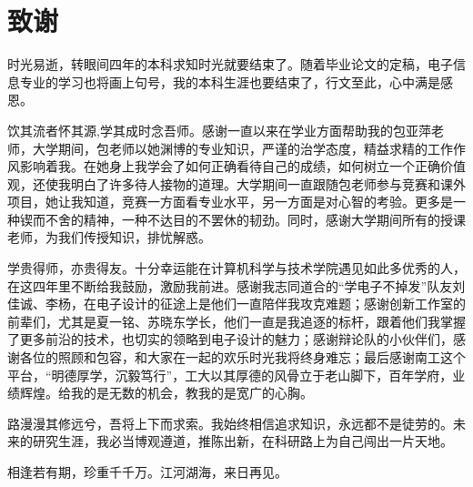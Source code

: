 \chapter[致谢]{致\quad 谢}%
\thispagestyle{noheaderstyle}%

时光易逝，转眼间四年的本科求知时光就要结束了。随着毕业论文的定稿，电子信息专业的学习也将画上句号，我的本科生涯也要结束了，行文至此，心中满是感恩。

饮其流者怀其源,学其成时念吾师。感谢一直以来在学业方面帮助我的包亚萍老师，大学期间，包老师以她渊博的专业知识，严谨的治学态度，精益求精的工作作风影响着我。在她身上我学会了如何正确看待自己的成绩，如何树立一个正确价值观，还使我明白了许多待人接物的道理。大学期间一直跟随包老师参与竞赛和课外项目，她让我知道，竞赛一方面看专业水平，另一方面是对心智的考验。更多是一种锲而不舍的精神，一种不达目的不罢休的韧劲。同时，感谢大学期间所有的授课老师，为我们传授知识，排忧解惑。

学贵得师，亦贵得友。十分幸运能在计算机科学与技术学院遇见如此多优秀的人，在这四年里不断给我鼓励，激励我前进。感谢我志同道合的“学电子不掉发”队友刘佳诚、李杨，在电子设计的征途上是他们一直陪伴我攻克难题；感谢创新工作室的前辈们，尤其是夏一铭、苏晓东学长，他们一直是我追逐的标杆，跟着他们我掌握了更多前沿的技术，也切实的领略到电子设计的魅力；感谢辩论队的小伙伴们，感谢各位的照顾和包容，和大家在一起的欢乐时光我将终身难忘；最后感谢南工这个平台，“明德厚学，沉毅笃行”，工大以其厚德的风骨立于老山脚下，百年学府，业绩辉煌。给我的是无数的机会，教我的是宽广的心胸。

路漫漫其修远兮，吾将上下而求索。我始终相信追求知识，永远都不是徒劳的。未来的研究生涯，我必当博观遵道，推陈出新，在科研路上为自己闯出一片天地。

相逢若有期，珍重千千万。江河湖海，来日再见。

\cleardoublepage[plain]%

